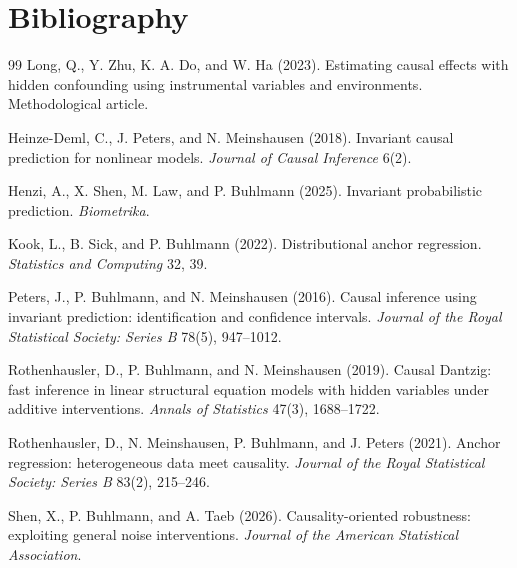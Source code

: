 \documentclass[11pt]{article}
\theoremstyle{definition}
\theoremstyle{plain}
\theoremstyle{remark}
\begin{document}
\section*{Bibliography}
\begin{thebibliography}{99}
Long, Q., Y. Zhu, K. A. Do, and W. Ha (2023). Estimating causal effects with hidden confounding using instrumental variables and environments. Methodological article.

Heinze-Deml, C., J. Peters, and N. Meinshausen (2018). Invariant causal prediction for nonlinear models. \emph{Journal of Causal Inference} 6(2).

Henzi, A., X. Shen, M. Law, and P. Buhlmann (2025). Invariant probabilistic prediction. \emph{Biometrika}.

Kook, L., B. Sick, and P. Buhlmann (2022). Distributional anchor regression. \emph{Statistics and Computing} 32, 39.

Peters, J., P. Buhlmann, and N. Meinshausen (2016). Causal inference using invariant prediction: identification and confidence intervals. \emph{Journal of the Royal Statistical Society: Series B} 78(5), 947--1012.

Rothenhausler, D., P. Buhlmann, and N. Meinshausen (2019). Causal Dantzig: fast inference in linear structural equation models with hidden variables under additive interventions. \emph{Annals of Statistics} 47(3), 1688--1722.

Rothenhausler, D., N. Meinshausen, P. Buhlmann, and J. Peters (2021). Anchor regression: heterogeneous data meet causality. \emph{Journal of the Royal Statistical Society: Series B} 83(2), 215--246.

Shen, X., P. Buhlmann, and A. Taeb (2026). Causality-oriented robustness: exploiting general noise interventions. \emph{Journal of the American Statistical Association}.
\end{thebibliography}
\end{document}
